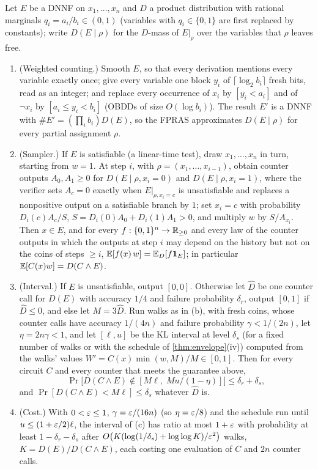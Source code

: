 \begin{theorem}\label{thm:sis}
Let $E$ be a DNNF on $x_1,\dots,x_n$ and $D$ a product distribution with rational
marginals $q_i=a_i/b_i\in(0,1)$ (variables with $q_i\in\{0,1\}$ are first replaced
by constants); write $D(E\mid\rho)$ for the $D$-mass of $E|_\rho$ over the
variables that $\rho$ leaves free.
\begin{enumerate}[label=(\alph*)]
\item (Weighted counting.) Smooth $E$, so that every derivation mentions every
variable exactly once; give every variable one block $y_i$ of
$\lceil\log_2b_i\rceil$ fresh bits, read as an integer; and replace every
occurrence of $x_i$ by $[y_i<a_i]$ and of $\neg x_i$ by $[a_i\le y_i<b_i]$ (OBDDs
of size $O(\log b_i)$). The result $E'$ is a DNNF with $\#E'=(\prod_ib_i)D(E)$, so
the FPRAS approximates $D(E\mid\rho)$ for every partial assignment $\rho$.
\item (Sampler.) If $E$ is satisfiable (a linear-time test), draw
$x_1,\dots,x_n$ in turn, starting from $w=1$. At step $i$, with
$\rho=(x_1,\dots,x_{i-1})$, obtain counter outputs $A_0,A_1\ge0$ for
$D(E\mid\rho,x_i=0)$ and $D(E\mid\rho,x_i=1)$, where the verifier sets $A_c=0$
exactly when $E|_{\rho,x_i=c}$ is unsatisfiable and replaces a nonpositive output
on a satisfiable branch by $1$; set $x_i=c$ with probability $D_i(c)A_c/S$,
$S=D_i(0)A_0+D_i(1)A_1>0$, and multiply $w$ by $S/A_{x_i}$. Then $x\in E$, and for
every $f:\{0,1\}^n\to\mathbb{R}_{\ge0}$ and every law of the counter outputs in which the
outputs at step $i$ may depend on the history but not on the coins of steps
$\ge i$, $\mathbb{E}[f(x)\,w]=\mathbb{E}_D[f\mathbf{1}_E]$; in particular $\mathbb{E}[C(x)w]=D(C\wedge E)$.
\item (Interval.) If $E$ is unsatisfiable, output $[0,0]$. Otherwise let $\hat D$
be one counter call for $D(E)$ with accuracy $1/4$ and failure probability
$\delta_r$, output $[0,1]$ if $\hat D\le0$, and else let $M=3\hat D$. Run walks as in
(b), with fresh coins, whose counter calls have accuracy $1/(4n)$ and failure
probability $\gamma<1/(2n)$, let $\eta=2n\gamma<1$, and let $[\ell,u]$ be the KL interval
at level $\delta_s$ (for a fixed number of walks or with the schedule of
\cref{thm:envelope}(iv)) computed from the walks' values
$W'=C(x)\min(w,M)/M\in[0,1]$. Then for every circuit
$C$ and every counter that meets the guarantee above,
\[
\Pr\big[D(C\wedge E)\notin[M\ell,\;Mu/(1-\eta)]\big]\le\delta_r+\delta_s,
\]
and $\Pr[D(C\wedge E)<M\ell]\le\delta_s$ whatever $\hat D$ is.
\item (Cost.) With $0<\varepsilon\le1$, $\gamma=\varepsilon/(16n)$ (so $\eta=\varepsilon/8$) and the
schedule run until $u\le(1+\varepsilon/2)\ell$, the interval of (c) has ratio at most
$1+\varepsilon$ with probability at least $1-\delta_r-\delta_s$ after
$O\big(K(\log(1/\delta_s)+\log\log K)/\varepsilon^2\big)$ walks, $K=D(E)/D(C\wedge E)$, each
costing one evaluation of $C$ and $2n$ counter calls.
\end{enumerate}
\end{theorem}

